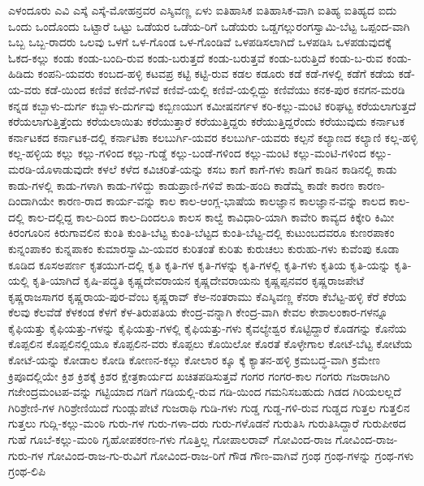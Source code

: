 {ಎಳಂದೂರು
ಎವಿ
ಎಸ್ಕೆ
ಎಸ್ಕೆ-ಮೋಹನ್ರವರ
ಎಸ್ಶಿವಣ್ಣ
ಏಳು
ಐತಿಹಾಸಿಕ
ಐತಿಹಾಸಿಕ-ವಾಗಿ
ಐತಿಹ್ಯ
ಐತಿಹ್ಯದ
ಐದು
ಒಂದು
ಒಂದೊಂದು
ಒಟ್ಟಾರೆ
ಒಟ್ಟು
ಒಡೆಯರ
ಒಡೆಯ-ರಿಗೆ
ಒಡೆಯರು
ಒಡ್ಡಗಲ್ಲುರಂಗಸ್ವಾಮಿ-ಬೆಟ್ಟ
ಒಪ್ಪಂದ-ವಾಗಿ
ಒಬ್ಬ
ಒಬ್ಬ-ರಾದರು
ಒಲವು
ಒಳಗೆ
ಒಳ-ಗೊಂಡ
ಒಳ-ಗೊಂಡಿವೆ
ಒಳಪಡಿಸಲಾಗಿದೆ
ಒಳಪಡಿಸಿ
ಒಳಪಡುವುದಕ್ಕೆ
ಓಕದ-ಕಲ್ಲು
ಕಂಡು
ಕಂಡು-ಬಂದಿ-ರುವ
ಕಂಡು-ಬರುತ್ತದೆ
ಕಂಡು-ಬರುತ್ತವೆ
ಕಂಡು-ಬರುತ್ತಿದೆ
ಕಂಡು-ಬ-ರುವ
ಕಂಡು-ಹಿಡಿದು
ಕಂಪನಿ-ಯವರು
ಕಂಬದ-ಹಳ್ಳಿ
ಕಟವಪ್ರ
ಕಟ್ಟಿ
ಕಟ್ಟಿ-ರುವ
ಕಡಲ
ಕಡೂರು
ಕಡೆ
ಕಡೆ-ಗಳಲ್ಲಿ
ಕಡೆಗೆ
ಕಡೆಯ
ಕಡೆ-ಯ-ವರು
ಕಡೆ-ಯಿಂದ
ಕಣಿವೆ
ಕಣಿವೆ-ಗಳಿವೆ
ಕಣಿವೆ-ಯಲ್ಲಿ
ಕಣಿವೆ-ಯಲ್ಲಿದ್ದು
ಕಣಿವೆಯು
ಕನಕ-ಪುರ
ಕನಗನ-ಮರಡಿ
ಕನ್ನಡ
ಕಬ್ಬಾಳು-ದುರ್ಗ
ಕಬ್ಬಾಳು-ದುರ್ಗವು
ಕಬ್ಬಿಣಯುಗ
ಕಮೀಷನರ್ಗಳ
ಕರಿ-ಕಲ್ಲು-ಮಂಟಿ
ಕರಿಘಟ್ಟ
ಕರೆಯಲಾಗುತ್ತದೆ
ಕರೆಯಲಾಗುತ್ತಿತ್ತೆಂದು
ಕರೆಯಲಾಯಿತು
ಕರೆಯುತ್ತಾರೆ
ಕರೆಯುತ್ತಿದ್ದರು
ಕರೆಯುತ್ತಿದ್ದರೆಂದು
ಕರೆಯುವುದು
ಕರ್ನಾಟಕ
ಕರ್ನಾಟಕದ
ಕರ್ನಾಟಕ-ದಲ್ಲಿ
ಕರ್ನಾಟಿಕಾ
ಕಲಬುರ್ಗಿ-ಯವರ
ಕಲಬುರ್ಗಿ-ಯವರು
ಕಲ್ಪನೆ
ಕಲ್ಯಾಣದ
ಕಲ್ಯಾಣಿ
ಕಲ್ಲ-ಹಳ್ಳಿ
ಕಲ್ಲ-ಹಳ್ಳಿಯ
ಕಲ್ಲು
ಕಲ್ಲು-ಗಳಿಂದ
ಕಲ್ಲು-ಗುಡ್ಡೆ
ಕಲ್ಲು-ಬಂಡೆ-ಗಳಿಂದ
ಕಲ್ಲು-ಮಂಟಿ
ಕಲ್ಲು-ಮಂಟಿ-ಗಳಿಂದ
ಕಲ್ಲು-ಮರಡಿ-ಯೊಳಾಡುವುದೇ
ಕಳಲೆ
ಕಳೆದ
ಕವಿಚರಿತೆ-ಯನ್ನು
ಕಸಬ
ಕಾಗೆ
ಕಾಗೆ-ಗಳು
ಕಾಡಿಗೆ
ಕಾಡಿನ
ಕಾಡಿನಲ್ಲಿ
ಕಾಡು
ಕಾಡು-ಗಳಲ್ಲಿ
ಕಾಡು-ಗಳಾಗಿ
ಕಾಡು-ಗಳಿದ್ದು
ಕಾಡುಪ್ರಾಣಿ-ಗಳಿವೆ
ಕಾಡು-ಹಂದಿ
ಕಾಡೆಮ್ಮೆ
ಕಾಡೇ
ಕಾರಣ
ಕಾರಣ-ದಿಂದಾಗಿಯೇ
ಕಾರಣ-ರಾದ
ಕಾರ್ಯ-ವನ್ನು
ಕಾಲ
ಕಾಲ-ಆಂಗ್ಲ-ಭಾಷೆಯ
ಕಾಲಜ್ಞಾನ
ಕಾಲಜ್ಞಾನ-ವನ್ನು
ಕಾಲದ
ಕಾಲ-ದಲ್ಲಿ
ಕಾಲ-ದಲ್ಲಿದ್ದ
ಕಾಲ-ದಿಂದ
ಕಾಲ-ದಿಂದಲೂ
ಕಾಲಸ
ಕಾಲ್ವೆ
ಕಾವಿಧಾರಿ-ಯಾಗಿ
ಕಾವೇರಿ
ಕಾವ್ಯದ
ಕಿಕ್ಕೇರಿ
ಕಿಮೀ
ಕಿರಂಗೂರಿನ
ಕಿರುಗಾವಲಿನ
ಕುಂತಿ
ಕುಂತಿ-ಬೆಟ್ಟ
ಕುಂತಿ-ಬೆಟ್ಟದ
ಕುಂತಿ-ಬೆಟ್ಟ-ದಲ್ಲಿ
ಕುಟುಂಬದವರೂ
ಕುಣರಪಾಕಂ
ಕುನ್ನಂಪಾಕಂ
ಕುನ್ನಪಾಕಂ
ಕುಮಾರಸ್ವಾಮಿ-ಯವರ
ಕುರಿತಂತೆ
ಕುರಿತು
ಕುರುಚಲು
ಕುರುಹು-ಗಳು
ಕುವೆಂಪು
ಕೂಡಾ
ಕೂಡಿದ
ಕೂಸಅಪರ್ಣ
ಕೃತಯುಗ-ದಲ್ಲಿ
ಕೃತಿ
ಕೃತಿ-ಗಳ
ಕೃತಿ-ಗಳನ್ನು
ಕೃತಿ-ಗಳಲ್ಲಿ
ಕೃತಿ-ಗಳು
ಕೃತಿಯ
ಕೃತಿ-ಯನ್ನು
ಕೃತಿ-ಯಲ್ಲಿ
ಕೃತಿ-ಯಾಗಿದೆ
ಕೃಷಿ-ಪದ್ಧತಿ
ಕೃಷ್ಣದೇವರಾಯನ
ಕೃಷ್ಣದೇವರಾಯನು
ಕೃಷ್ಣಪ್ಪನವರ
ಕೃಷ್ಣರಾಜಪೇಟೆ
ಕೃಷ್ಣರಾಜಸಾಗರ
ಕೃಷ್ಣರಾಯ-ಪುರ-ವೆಂಬ
ಕೃಷ್ಣರಾವ್
ಕೆಅ-ನಂತರಾಮು
ಕೆಎಸ್ಶಿವಣ್ಣ
ಕೆನರಾ
ಕೆಬೆಟ್ಟ-ಹಳ್ಳಿ
ಕೆರೆ
ಕೆರೆಯ
ಕೆಲವು
ಕೆಲವೆಡೆ
ಕೆಳಕಂಡ
ಕೆಳಗೆ
ಕೆಳ-ತಿರುಪತಿಯ
ಕೇಂದ್ರ-ವನ್ನಾಗಿ
ಕೇಂದ್ರ-ವಾಗಿ
ಕೇವಲ
ಕೇಶಾಲಂಕಾರ-ಗಳನ್ನೂ
ಕೈಫಿಯತ್ತು
ಕೈಫಿಯತ್ತು-ಗಳನ್ನು
ಕೈಫಿಯತ್ತು-ಗಳಲ್ಲಿ
ಕೈಫಿಯತ್ತು-ಗಳು
ಕೈವಲ್ಯೇಶ್ವರ
ಕೊಟ್ಟಿದ್ದಾರೆ
ಕೊಡಗನ್ನು
ಕೊನೆಯ
ಕೊಪ್ಪಲಿನ
ಕೊಪ್ಪಲಿನಲ್ಲಿಯೂ
ಕೊಪ್ಪಲಿನ-ವರು
ಕೊಪ್ಪಲು
ಕೊಯಿಲೋ
ಕೊರತೆ
ಕೊಳ್ಳೇಗಾಲ
ಕೋಟೆ-ಬೆಟ್ಟ
ಕೋಟೆಯ
ಕೋಟೆ-ಯನ್ನು
ಕೋಡಾಲ
ಕೋಡಿ
ಕೋಣನ-ಕಲ್ಲು
ಕೋಲಾರ
ಕ್ಕೂ
ಕ್ಕೆ
ಕ್ಯಾತನ-ಹಳ್ಳಿ
ಕ್ರಮಬದ್ಧ-ವಾಗಿ
ಕ್ರಮೇಣ
ಕ್ರಿಪೂದಲ್ಲಿಯೇ
ಕ್ರಿಶ
ಕ್ರಿಶಕ್ಕೆ
ಕ್ರಿಶರ
ಕ್ಷೇತ್ರಕಾರ್ಯದ
ಖಚಿತಪಡಿಸುತ್ತವೆ
ಗಂಗರ
ಗಂಗರ-ಕಾಲ
ಗಂಗರು
ಗಜರಾಜಗಿರಿ
ಗಜೇಂದ್ರಮಂಟಪ-ವನ್ನು
ಗಟ್ಟಿಯಾದ
ಗಡಿಗೆ
ಗಡಿಯಲ್ಲಿ-ರುವ
ಗಡಿ-ಯಿಂದ
ಗಮನಿಸಬಹುದು
ಗಿಡದ
ಗಿರಿಯಲಲ್ಲದೆ
ಗಿರಿಶ್ರೇಣಿ-ಗಳ
ಗಿರಿಶ್ರೇಣಿಯಿದೆ
ಗುಂಡ್ಲುಪೇಟೆ
ಗುಜರಾಥಿ
ಗುಡಿ-ಗಳು
ಗುಡ್ಡ
ಗುಡ್ಡ-ಗಳಿ-ರುವ
ಗುಡ್ಡದ
ಗುತ್ತಲ
ಗುತ್ತಲಿನ
ಗುತ್ತಲು
ಗುದ್ಲಿ-ಕಲ್ಲು-ಮಂಠಿ
ಗುರು-ಗಳ
ಗುರು-ಗಳಾ-ದರು
ಗುರು-ಗಳೊಡನೆ
ಗುರುತಿಸಿ
ಗುರುತಿಸಿದ್ದಾರೆ
ಗುರುಪೀಠದ
ಗುಹೆ
ಗೂಬೆ-ಕಲ್ಲು-ಮಂಠಿ
ಗೃಹೋಪಕರಣ-ಗಳು
ಗೊತ್ತಿಲ್ಲ
ಗೋಪಾಲರಾವ್
ಗೋವಿಂದ-ರಾಜ
ಗೋವಿಂದ-ರಾಜ-ಗುರು-ಗಳ
ಗೋವಿಂದ-ರಾಜ-ಗು-ರುವಿಗೆ
ಗೋವಿಂದ-ರಾಜ-ರಿಗೆ
ಗೌಡ
ಗೌಣ-ವಾಗಿವೆ
ಗ್ರಂಥ
ಗ್ರಂಥ-ಗಳನ್ನು
ಗ್ರಂಥ-ಗಳು
ಗ್ರಂಥ-ಲಿಪಿ
}
